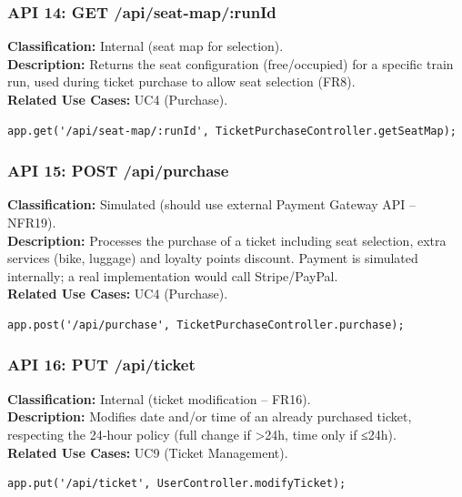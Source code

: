 \documentclass{article}
\begin{document}
\subsubsection*{API 14: GET /api/seat-map/:runId}
\textbf{Classification:} Internal (seat map for selection).\\
\textbf{Description:} Returns the seat configuration (free/occupied) for a
specific train run, used during ticket purchase to allow seat selection (FR8).\\
\textbf{Related Use Cases:} UC4 (Purchase).
\begin{verbatim}
app.get('/api/seat-map/:runId', TicketPurchaseController.getSeatMap);
\end{verbatim}

\subsubsection*{API 15: POST /api/purchase}
\textbf{Classification:} Simulated (should use external Payment Gateway API – NFR19).\\
\textbf{Description:} Processes the purchase of a ticket including seat selection,
extra services (bike, luggage) and loyalty points discount. Payment is simulated
internally; a real implementation would call Stripe/PayPal.\\
\textbf{Related Use Cases:} UC4 (Purchase).
\begin{verbatim}
app.post('/api/purchase', TicketPurchaseController.purchase);
\end{verbatim}

\subsubsection*{API 16: PUT /api/ticket}
\textbf{Classification:} Internal (ticket modification – FR16).\\
\textbf{Description:} Modifies date and/or time of an already purchased ticket,
respecting the 24‑hour policy (full change if >24h, time only if ≤24h).\\
\textbf{Related Use Cases:} UC9 (Ticket Management).
\begin{verbatim}
app.put('/api/ticket', UserController.modifyTicket);
\end{verbatim}
\end{document}
